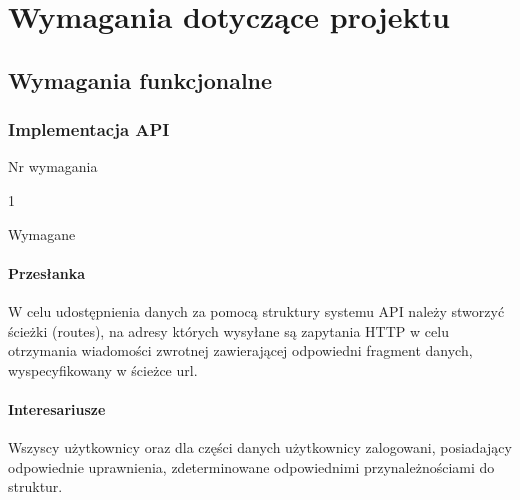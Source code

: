 \documentclass[eng,printmode]{mgr}
\begin{document}
\chapter{Wymagania dotyczące projektu}

\section{Wymagania funkcjonalne}

\subsection{Implementacja API}
\begin{labeling}{Nr wymagania}
\item [Nr wymagania:] 1
\item [Priorytet:] Wymagane
\end{labeling}

\subsubsection{Przesłanka}
W celu udostępnienia danych za pomocą struktury systemu API należy stworzyć ścieżki (routes), na adresy których wysyłane są zapytania HTTP w celu otrzymania wiadomości zwrotnej zawierającej odpowiedni fragment danych, wyspecyfikowany w ścieżce url.

\subsubsection{Interesariusze}
Wszyscy użytkownicy oraz dla części danych użytkownicy zalogowani, posiadający odpowiednie uprawnienia, zdeterminowane odpowiednimi przynależnościami do struktur.
\end{document}
